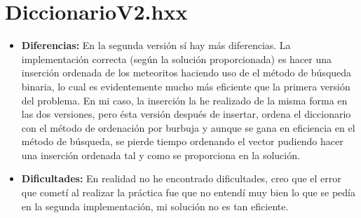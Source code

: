 \section{DiccionarioV2.hxx}

\begin{itemize}

  \item \textbf{Diferencias:} En la segunda versión sí hay más diferencias. La implementación correcta (según la solución proporcionada) es 
  hacer una inserción ordenada de los meteoritos haciendo uso de el método de 
  búsqueda binaria, lo cual es evidentemente mucho más eficiente que la primera 
  versión del problema. En mi caso, la inserción la he realizado de la misma 
  forma en las dos versiones, pero ésta versión después de insertar, ordena el 
  diccionario con el método de ordenación por burbuja y aunque se gana en 
  eficiencia en el método de búsqueda, se pierde tiempo ordenando el vector 
  pudiendo hacer una inserción ordenada tal y como se proporciona en la 
  solución.
  \item \textbf{Dificultades:} En realidad no he encontrado dificultades, creo 
  que el error que cometí al realizar la práctica fue que no entendí muy bien lo 
  que se pedía en la segunda implementación, mi solución no es tan eficiente.

\end{itemize}

